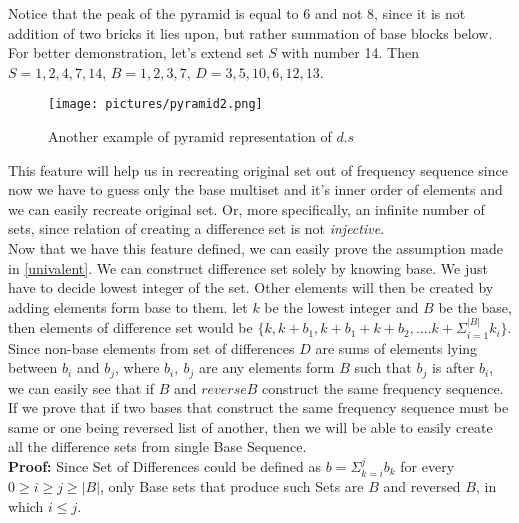 Notice that the peak of the pyramid is equal to 6 and not 8, since it is not addition of two bricks it lies upon, but rather summation of base blocks below. \\

For better demonstration, let's extend set $S$ with number 14. Then $S = {1,2,4,7,14}$, $B = {1,2,3,7}$, $D = {3,5,10,6,12,13}$.
\begin{center}
\begin{figure}[here]
 \texttt{[image: pictures/pyramid2.png]}
 \caption{Another example of pyramid representation of $d.s $}
 \label{fig:Pyramid example number 2}
 \end{figure}
\end{center}

This feature will help us in recreating original set out of frequency sequence since now we have to guess only the base multiset and it's inner order of elements and we can easily recreate original set. Or, more specifically, an infinite number of sets, since relation of creating a difference set is not \textit{injective}. \\

Now that we have this feature defined, we can easily prove the assumption made in \ref{univalent}. We can construct difference set solely by knowing base. We just have to decide lowest integer of the set. Other elements will then be created by adding elements  form base to them. let $k$ be the lowest integer and $B$ be the base, then elements of difference set would be $\{k,k+b_1,k+b_1+k+b_2,....k+\Sigma_{i=1}^{|B|} k_i\}$. Since non-base elements from set of differences $D$ are sums of elements lying between $b_i$ and $b_j$, where $b_i,\ b_j$ are any elements form $B$ such that $b_j$ is after $b_i$, we can easily see that if $B$ and  $reverse B$ construct the same frequency sequence. If we prove that if two  bases that construct the same frequency sequence must be same or one being reversed list of another, then we will be able to easily create all the difference sets from single Base Sequence.\\

\textbf{Proof:} Since Set of Differences could be defined as $b = {\Sigma_{k = i}^{j} b_k}$ for every $0 \geq i \geq j \ge |B|$, only Base sets that produce such Sets are $B$ and reversed $B$, in which $i \leq j$.

